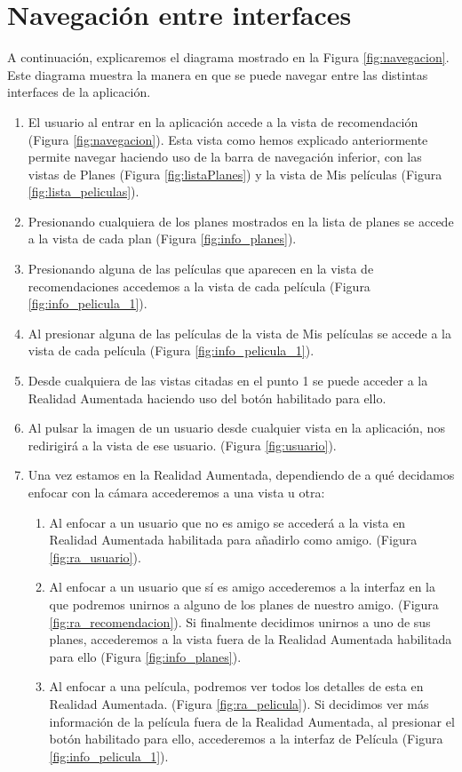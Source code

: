 \section{Navegación entre interfaces}
A continuación, explicaremos el diagrama mostrado en la Figura \ref{fig:navegacion}. Este diagrama muestra la manera en que se puede navegar entre las distintas interfaces
de la aplicación.
\begin{enumerate}
    \item El usuario al entrar en la aplicación accede a la vista de recomendación (Figura \ref{fig:navegacion}). Esta vista como hemos explicado anteriormente
permite navegar haciendo uso de la barra de navegación inferior, con las vistas de Planes (Figura \ref{fig:listaPlanes}) y la vista de Mis películas (Figura \ref{fig:lista_peliculas}).
    \item Presionando cualquiera de los planes mostrados en la lista de planes se accede a la vista de cada plan (Figura \ref{fig:info_planes}).
    \item Presionando alguna de las películas que aparecen en la vista de recomendaciones accedemos a la vista de cada película (Figura \ref{fig:info_pelicula_1}).
    \item Al presionar alguna de las películas de la vista de Mis películas se accede a la vista de cada película (Figura \ref{fig:info_pelicula_1}).
    \item Desde cualquiera de las vistas citadas en el punto 1 se puede acceder a la Realidad Aumentada haciendo uso del botón habilitado para ello.
    \item Al pulsar la imagen de un usuario desde cualquier vista en la aplicación, nos redirigirá a la vista de ese usuario. (Figura \ref{fig:usuario}).
    \item Una vez estamos en la Realidad Aumentada, dependiendo de a qué decidamos enfocar con la cámara accederemos a una vista u otra:
    \begin{enumerate}
        \item Al enfocar a un usuario que no es amigo se accederá a la vista en Realidad Aumentada habilitada para añadirlo como amigo. (Figura \ref{fig:ra_usuario}).
        \item Al enfocar a un usuario que sí es amigo accederemos a la interfaz en la que podremos unirnos a alguno de los planes de nuestro amigo. (Figura \ref{fig:ra_recomendacion}).
        Si finalmente decidimos unirnos a uno de sus planes, accederemos a la vista fuera de la Realidad Aumentada habilitada para ello (Figura \ref{fig:info_planes}).
        \item Al enfocar a una película, podremos ver todos los detalles de esta en Realidad Aumentada. (Figura \ref{fig:ra_pelicula}). Si decidimos ver más información de la película
        fuera de la Realidad Aumentada, al presionar el botón habilitado para ello, accederemos a la interfaz de Película (Figura \ref{fig:info_pelicula_1}).
    \end{enumerate}
\end{enumerate}

